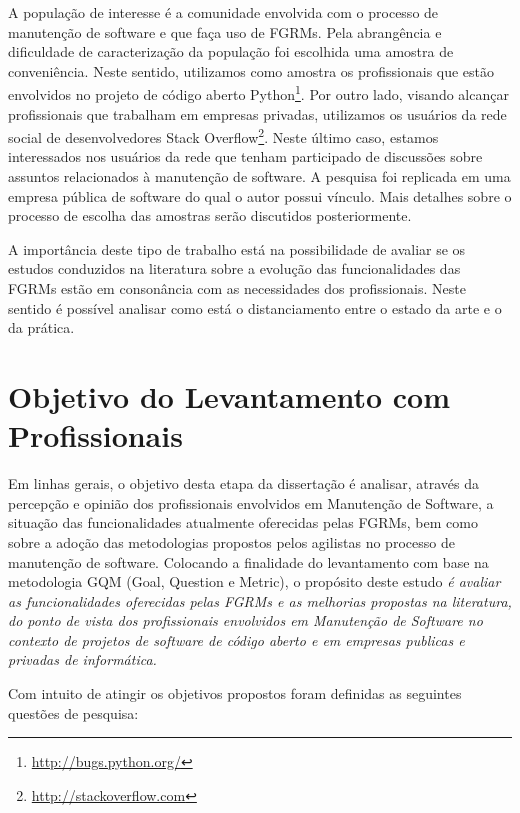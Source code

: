A população de interesse é a comunidade envolvida com o processo de manutenção
de software e que faça uso de FGRMs. Pela abrangência e dificuldade de
caracterização da população foi escolhida uma amostra de conveniência. Neste
sentido, utilizamos como amostra os profissionais que estão envolvidos no
projeto de código aberto Python\footnote{\url{http://bugs.python.org/}}. Por
outro lado, visando alcançar profissionais que trabalham em empresas privadas,
utilizamos os usuários da rede social de desenvolvedores Stack
Overflow\footnote{\url{http://stackoverflow.com}}. Neste último caso, estamos
interessados nos usuários da rede que tenham participado de discussões sobre
assuntos relacionados à manutenção de software. A pesquisa foi replicada em uma
empresa pública de software do qual o autor possui vínculo. Mais detalhes sobre
o processo de escolha das amostras serão discutidos posteriormente.

A importância deste tipo de trabalho está na possibilidade de avaliar se os
estudos conduzidos na literatura sobre a evolução das funcionalidades das FGRMs
estão em consonância com as necessidades dos profissionais. Neste sentido é
possível analisar como está o distanciamento entre o estado da arte e o da
prática.

\section{Objetivo do Levantamento com Profissionais}
\label{sec:objetivo_da_pesquisa_com_profissionais}

Em linhas gerais, o objetivo desta etapa da dissertação é analisar, através da
percepção e opinião dos profissionais envolvidos em Manutenção de Software, a
situação das funcionalidades atualmente oferecidas pelas FGRMs, bem como sobre a
adoção das metodologias propostos pelos agilistas no processo de manutenção de
software. Colocando a finalidade do levantamento com base na metodologia
GQM (Goal, Question e Metric)\cite{gqm}, o propósito deste estudo \textit{é
    avaliar as funcionalidades oferecidas pelas FGRMs e as melhorias propostas
    na literatura, do ponto de vista dos profissionais envolvidos em Manutenção
    de Software no contexto de projetos de software de código aberto e em
    empresas publicas e privadas de informática.}

Com intuito de atingir os objetivos propostos foram definidas as seguintes
questões de pesquisa:

